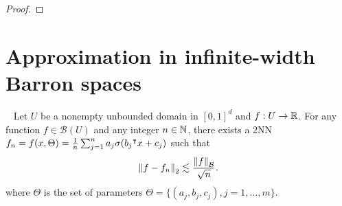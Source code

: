 \begin{proof}


\end{proof}

\section{Approximation in infinite-width Barron spaces}
\label{sec:appro_barron_space}

\begin{theorem} \
    \label{thm:barron_direct_appro_l2}
    Let $U$ be a nonempty unbounded domain in $[0,1]^d$ and $f: U \to \mathbb{R}$. For
    any function $f \in \mathcal{B}(U)$ and any integer $n \in \mathbb{N}$, there
    exists a 2NN $f_n = f(x, \Theta) = \frac{1}{n}\sum_{j=1}^n a_j \sigma(b_j{}^{\intercal}
    x + c_j)$ such that
    \begin{equation}
        \left\| f - f_n \right\|_2 \lesssim \frac{\left\| f \right\|_{\mathcal{B}}}{\sqrt{n}}.
    \end{equation}
    where $\Theta$ is the set of parameters $\Theta = \{(a_j, b_j, c_j),
    j=1,\dots,m\}$.

\end{theorem}

